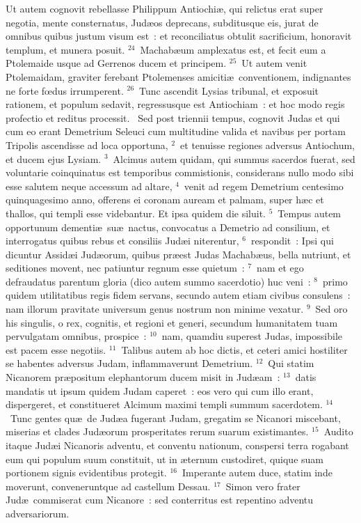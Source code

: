  Ut autem cognovit rebellasse Philippum Antiochi\ae , qui relictus erat super negotia, mente consternatus, Jud\ae os deprecans, subditusque eis, jurat de omnibus quibus justum visum est~: et reconciliatus obtulit sacrificium, honoravit templum, et munera posuit.
${}^{24}$~Machab\ae um amplexatus est, et fecit eum a Ptolemaide usque ad Gerrenos ducem et principem.
${}^{25}$~Ut autem venit Ptolemaidam, graviter ferebant Ptolemenses amiciti\ae\ conventionem, indignantes ne forte fœdus irrumperent.
${}^{26}$~Tunc ascendit Lysias tribunal, et exposuit rationem, et populum sedavit, regressusque est Antiochiam~: et hoc modo regis profectio et reditus processit.
~\lettrine[lines=10,image=true,loversize=0.05,lraise=-0.03]{S}{}ed post triennii tempus, cognovit Judas et qui cum eo erant Demetrium Seleuci cum multitudine valida et navibus per portam Tripolis ascendisse ad loca opportuna,
${}^{2}$~et tenuisse regiones adversus Antiochum, et ducem ejus Lysiam.
${}^{3}$~Alcimus autem quidam, qui summus sacerdos fuerat, sed voluntarie coinquinatus est temporibus commistionis, considerans nullo modo sibi esse salutem neque accessum ad altare,
${}^{4}$~venit ad regem Demetrium centesimo quinquagesimo anno, offerens ei coronam auream et palmam, super h\ae c et thallos, qui templi esse videbantur. Et ipsa quidem die siluit.
${}^{5}$~Tempus autem opportunum dementi\ae\ su\ae\ nactus, convocatus a Demetrio ad consilium, et interrogatus quibus rebus et consiliis Jud\ae i niterentur,
${}^{6}$~respondit~: Ipsi qui dicuntur Assid\ae i Jud\ae orum, quibus pr\ae est Judas Machab\ae us, bella nutriunt, et seditiones movent, nec patiuntur regnum esse quietum~:
${}^{7}$~nam et ego defraudatus parentum gloria (dico autem summo sacerdotio) huc veni~:
${}^{8}$~primo quidem utilitatibus regis fidem servans, secundo autem etiam civibus consulens~: nam illorum pravitate universum genus nostrum non minime vexatur.
${}^{9}$~Sed oro his singulis, o rex, cognitis, et regioni et generi, secundum humanitatem tuam pervulgatam omnibus, prospice~:
${}^{10}$~nam, quamdiu superest Judas, impossibile est pacem esse negotiis.
${}^{11}$~Talibus autem ab hoc dictis, et ceteri amici hostiliter se habentes adversus Judam, inflammaverunt Demetrium.
${}^{12}$~Qui statim Nicanorem pr\ae positum elephantorum ducem misit in Jud\ae am~:
${}^{13}$~datis mandatis ut ipsum quidem Judam caperet~: eos vero qui cum illo erant, dispergeret, et constitueret Alcimum maximi templi summum sacerdotem.
${}^{14}$~Tunc gentes qu\ae\ de Jud\ae a fugerant Judam, gregatim se Nicanori miscebant, miserias et clades Jud\ae orum prosperitates rerum suarum existimantes.
${}^{15}$~Audito itaque Jud\ae i Nicanoris adventu, et conventu nationum, conspersi terra rogabant eum qui populum suum constituit, ut in \ae ternum custodiret, quique suam portionem signis evidentibus protegit.
${}^{16}$~Imperante autem duce, statim inde moverunt, conveneruntque ad castellum Dessau.
${}^{17}$~Simon vero frater Jud\ae\ commiserat cum Nicanore~: sed conterritus est repentino adventu adversariorum.



